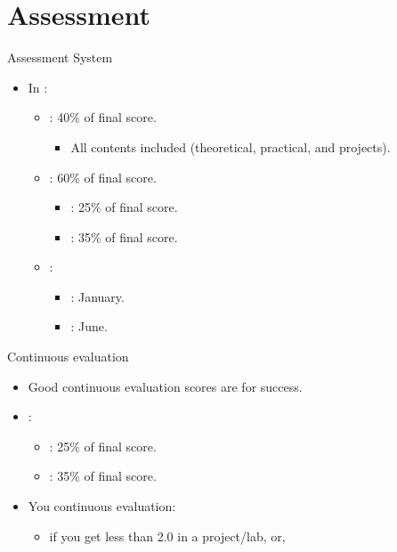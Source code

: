 \section{Assessment}

\begin{frame}[t]{Assessment System}
\begin{itemize}
  \item In :

    \begin{itemize}
      \item {}: 40\% of final score.
        \begin{itemize}
          \item All contents included (theoretical, practical, and projects).
        \end{itemize}

      \item {}: 60\% of final score.
        \begin{itemize}
          \item {}: 25\% of final score.
          \item {}: 35\% of final score.
        \end{itemize}

    \item {}:
      \begin{itemize}
        \item {}: January.
        \item {}: June.
      \end{itemize}
  \end{itemize}
\end{itemize}
\end{frame}

\begin{frame}[t]{Continuous evaluation}
\begin{itemize}
  \item Good continuous evaluation scores are  for success.

  \item {}:
    \begin{itemize}
      \item {}: 25\% of final score.
      \item {}: 35\% of final score.
    \end{itemize}
  \vspace{1em}

  \item You  continuous evaluation:
    \begin{itemize}
      \item if you get less than 2.0 in a project/lab, or,
    \end{itemize}
\end{itemize}
\end{frame}

